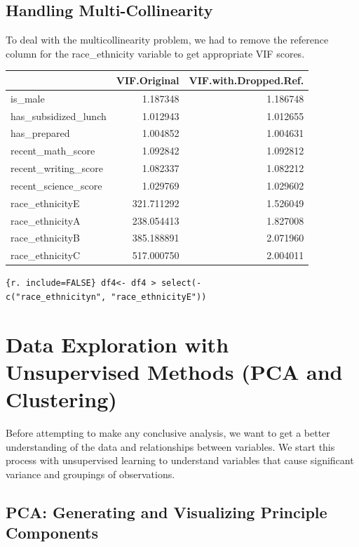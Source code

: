 \documentclass[
]{article}
\begin{document}
\subsection{Handling
Multi-Collinearity}\label{handling-multi-collinearity}

To deal with the multicollinearity problem, we had to remove the
reference column for the race\_ethnicity variable to get appropriate VIF
scores.

\begin{longtable}[]{@{}lrr@{}}
\toprule\noalign{}
& VIF.Original & VIF.with.Dropped.Ref. \\
\midrule\noalign{}
\endhead
\bottomrule\noalign{}
\endlastfoot
is\_male & 1.187348 & 1.186748 \\
has\_subsidized\_lunch & 1.012943 & 1.012655 \\
has\_prepared & 1.004852 & 1.004631 \\
recent\_math\_score & 1.092842 & 1.092812 \\
recent\_writing\_score & 1.082337 & 1.082212 \\
recent\_science\_score & 1.029769 & 1.029602 \\
race\_ethnicityE & 321.711292 & 1.526049 \\
race\_ethnicityA & 238.054413 & 1.827008 \\
race\_ethnicityB & 385.188891 & 2.071960 \\
race\_ethnicityC & 517.000750 & 2.004011 \\
\end{longtable}

\texttt{\{r.\ include=FALSE\}\ df4\textless{}-\ df4\ \textbar{}\textgreater{}\ select(-c("race\_ethnicityn",\ "race\_ethnicityE"))}

\section{Data Exploration with Unsupervised Methods (PCA and
Clustering)}\label{data-exploration-with-unsupervised-methods-pca-and-clustering}

Before attempting to make any conclusive analysis, we want to get a
better understanding of the data and relationships between variables. We
start this process with unsupervised learning to understand variables
that cause significant variance and groupings of observations.

\subsection{PCA: Generating and Visualizing Principle
Components}\label{pca-generating-and-visualizing-principle-components}
\end{document}
